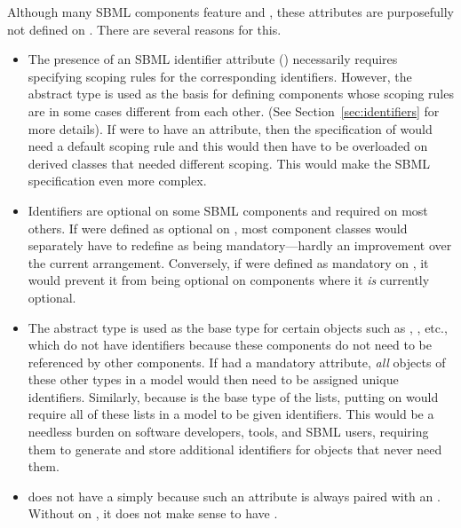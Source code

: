 Although many SBML components feature
 and , these attributes are purposefully not defined on
\SBase.  There are several reasons for this.
\begin{itemize}
  
\item The presence of an SBML identifier attribute ()
  necessarily requires specifying scoping rules for the
  corresponding identifiers.  However, the \SBase abstract type is
  used as the basis for defining components whose scoping rules
  are in some cases different from each other.  (See
  Section~\ref{sec:identifiers} for more details).  If \SBase were
  to have an  attribute, then the specification of \SBase
  would need a default scoping rule and this would then have to be
  overloaded on derived classes that needed different scoping.
  This would make the SBML specification even more complex.
  
\item Identifiers are optional on some SBML components and required
  on most others.  If  were defined as optional on
  \SBase, most component classes would separately have to redefine
   as being mandatory---hardly an improvement over the
  current arrangement.  Conversely, if  were defined as
  mandatory on \SBase, it would prevent it from being optional on
  components where it \emph{is} currently optional.
  
\item The \SBase abstract type is used as the base type for
  certain objects such as \Sbml, \AssignmentRule,
  etc., which do not have identifiers because these components do
  not need to be referenced by other components.  If \SBase had a
  mandatory  attribute, \emph{all} objects of
  these other types in a model would then need to be assigned
  unique identifiers.  Similarly, because \SBase is the
    base type of the  lists,
  putting  on \SBase would require all of these lists in
  a model to be given identifiers.  This would be a needless
  burden on software developers, tools, and SBML users, requiring
  them to generate and store additional identifiers for objects
  that never need them.
  
\item \SBase does not have a  simply because such an
  attribute is always paired with an .  Without
   on \SBase, it does not make sense to have
  .

\end{itemize}


